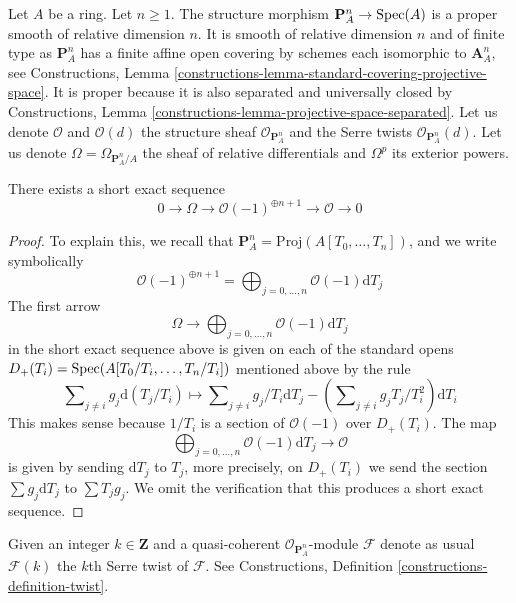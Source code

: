 \noindent
Let $A$ be a ring. Let $n \geq 1$. The structure morphism
$\mathbf{P}^n_A \to \mathop{\mathrm{Spec}}(A)$ is a proper smooth of relative
dimension $n$. It is smooth of relative dimension $n$ and of finite type
as $\mathbf{P}^n_A$ has a finite affine open covering by schemes each
isomorphic to $\mathbf{A}^n_A$, see Constructions, Lemma
\ref{constructions-lemma-standard-covering-projective-space}.
It is proper because it is also separated and universally closed
by Constructions, Lemma \ref{constructions-lemma-projective-space-separated}.
Let us denote $\mathcal{O}$ and $\mathcal{O}(d)$ the structure sheaf
$\mathcal{O}_{\mathbf{P}^n_A}$ and the Serre twists
$\mathcal{O}_{\mathbf{P}^n_A}(d)$.
Let us denote $\Omega = \Omega_{\mathbf{P}^n_A/A}$ the sheaf
of relative differentials and $\Omega^p$ its exterior powers.

\begin{lemma}
\label{lemma-euler-sequence}
There exists a short exact sequence
$$
0 \to \Omega \to \mathcal{O}(-1)^{\oplus n + 1} \to \mathcal{O} \to 0
$$
\end{lemma}

\begin{proof}
To explain this, we recall that
$\mathbf{P}^n_A = \text{Proj}(A[T_0, \ldots, T_n])$,
and we write symbolically
$$
\mathcal{O}(-1)^{\oplus n + 1} =
\bigoplus\nolimits_{j = 0, \ldots, n} \mathcal{O}(-1) \text{d}T_j
$$
The first arrow
$$
\Omega \to
\bigoplus\nolimits_{j = 0, \ldots, n} \mathcal{O}(-1) \text{d}T_j
$$
in the short exact sequence above
is given on each of the standard opens
$D_+(T_i) = \mathop{\mathrm{Spec}}(A[T_0/T_i, \ldots, T_n/T_i])$
mentioned above by the rule
$$
\sum\nolimits_{j \not = i} g_j \text{d}(T_j/T_i)
\longmapsto
\sum\nolimits_{j \not = i} g_j/T_i \text{d}T_j
- (\sum\nolimits_{j \not = i} g_jT_j/T_i^2) \text{d}T_i
$$
This makes sense because $1/T_i$ is a section of $\mathcal{O}(-1)$
over $D_+(T_i)$. The map
$$
\bigoplus\nolimits_{j = 0, \ldots, n} \mathcal{O}(-1) \text{d}T_j
\to
\mathcal{O}
$$
is given by sending $\text{d}T_j$ to $T_j$, more precisely, on
$D_+(T_i)$ we send the section $\sum g_j \text{d}T_j$ to
$\sum T_jg_j$. We omit the verification that this produces
a short exact sequence.
\end{proof}

\noindent
Given an integer $k \in \mathbf{Z}$ and a quasi-coherent
$\mathcal{O}_{\mathbf{P}^n_A}$-module $\mathcal{F}$
denote as usual $\mathcal{F}(k)$ the $k$th Serre twist of $\mathcal{F}$.
See Constructions, Definition \ref{constructions-definition-twist}.

